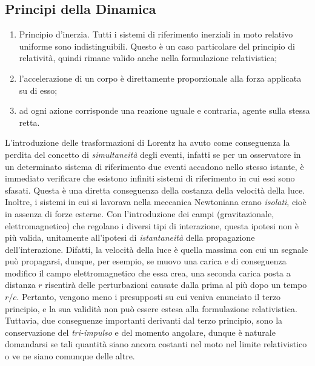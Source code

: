 \subsection{Principi della Dinamica}
\begin{enumerate}
 \item Principio d'inerzia. Tutti i sistemi di riferimento inerziali in moto relativo uniforme sono indistinguibili. Questo è un caso 
particolare del principio di relatività, quindi rimane valido anche nella formulazione relativistica;
\item l'accelerazione di un corpo è direttamente proporzionale alla forza applicata su di esso;
\item ad ogni azione corrisponde una reazione uguale e contraria, agente sulla stessa retta.
\end{enumerate}
L'introduzione delle trasformazioni di Lorentz ha avuto come conseguenza la perdita del concetto di \textit{simultaneità} degli eventi, 
infatti se per un osservatore in un determinato sistema di riferimento due eventi accadono nello stesso istante, è immediato verificare 
che esistono infiniti sistemi di riferimento in cui essi sono sfasati. Questa è una diretta conseguenza della costanza della velocità 
della luce. Inoltre, i sistemi in cui si lavorava nella meccanica Newtoniana erano \textit{isolati}, cioè in assenza di forze esterne. 
Con l'introduzione dei campi (gravitazionale, elettromagnetico) che regolano i diversi tipi di interazione, questa ipotesi non è più 
valida, unitamente all'ipotesi di \textit{istantaneità} della propagazione dell'interazione. Difatti, la velocità della luce è quella 
massima con cui un segnale può propagarsi, dunque, per esempio, se muovo una carica e di conseguenza modifico il campo elettromagnetico 
che essa crea, una seconda carica posta a distanza $r$ risentirà delle perturbazioni causate dalla prima al più dopo un tempo $r/c$. 
Pertanto, vengono meno i presupposti su cui veniva enunciato il terzo principio, e la sua validità non può essere estesa alla 
formulazione relativistica. Tuttavia, due conseguenze importanti derivanti dal terzo principio, sono la conservazione del \textit{tri-impulso} e del momento angolare, dunque è naturale domandarsi se tali quantità siano ancora costanti nel moto nel limite relativistico o 
ve ne siano comunque delle altre.
